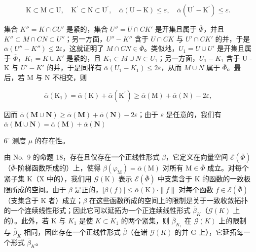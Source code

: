 \[
\mathrm{K} \subset \mathrm{M} \subset \mathrm{U}, \quad \mathrm{K} ^ {\prime} \subset \mathrm{N} \subset \mathrm{U} ^ {\prime}, \quad \overline {{\alpha}} (\mathrm{U} - \mathrm{K}) \leqslant \varepsilon , \quad \overline {{\alpha}} (\mathrm{U} ^ {\prime} - \mathrm{K} ^ {\prime}) \leqslant \varepsilon .
\]

集合 \(K'' = K \cap C U'\) 是紧的，集合 \(U'' = U \cap C K'\) 是开集且属于 \(\overline{\Phi}\)，并且 \(K'' \subset M \cap C N \subset U''\)；另一方面，\(U'' - K''\) 含于 \(U \cap C K\) 与 \(U' \cap C K'\) 的并，于是 \(\overline{\alpha}(U'' - K'') \leqslant 2\varepsilon\)，这就证明了 \(M \cap C N \in \overline{\Phi}\)。类似地，\(U_1 = U \cup U'\) 是开集且属于 \(\overline{\Phi}\)，\(K_1 = K \cup K'\) 是紧的，且 \(K_1 \subset M \cup N \subset U_1\)；另一方面，\(U_1 - K_1\) 含于 U - K 与 \(U' - K'\) 的并，于是同样有 \(\overline{\alpha}(U_1 - K_1) \leqslant 2\varepsilon\)，从而 \(M \cup N\) 属于 \(\overline{\Phi}\)。最后，若 M 与 N 不相交，则

\[
\overline {{{{\alpha}}}} \left(\mathrm{K} _ {1}\right) = \overline {{{{\alpha}}}} (\mathrm{K}) + \overline {{{{\alpha}}}} \left(\mathrm{K} ^ {\prime}\right) \geqslant \overline {{{{\alpha}}}} (\mathrm{M}) + \overline {{{{\alpha}}}} (\mathrm{N}) - 2 \varepsilon ,
\]

因而 \(\overline{\alpha} (\mathbf{M}\cup \mathbf{N})\geqslant \overline{\alpha} (\mathbf{M}) + \overline{\alpha} (\mathbf{N}) - 2\varepsilon\)；由于 \(\varepsilon\) 是任意的，我们有 \(\overline{\alpha} (\mathbf{M}\cup \mathbf{N}) = \overline{\alpha} (\mathbf{M}) + \overline{\alpha} (\mathbf{N})\)

\(6^{\circ}\) 测度 \(\mu\) 的存在性。

由 No.~9 的命题 18，存在且仅存在一个正线性形式 \(\beta\)，它定义在向量空间 \(\mathcal{E}(\overline{\Phi})\)（\(\overline{\Phi}\)-阶梯函数所成的）上，使得 \(\beta(\varphi_{\mathrm{M}}) = \overline{\alpha}(\mathrm{M})\) 对所有 \(\mathrm{M} \in \overline{\Phi}\) 成立。对每个紧子集 \(\mathrm{K}\)（\(\mathrm{X}\) 中的），我们用 \(\mathcal{G}(\mathrm{K})\) 表示 \(\mathcal{E}(\overline{\Phi})\) 中支集含于 \(\mathrm{K}\) 的函数的一致极限所成的空间。由于 \(\beta\) 是正的，\(|\beta(f)| \leqslant \overline{\alpha}(\mathrm{K}) \cdot \|f\|\) 对每个函数 \(f \in \mathcal{E}(\overline{\Phi})\)（支集含于 \(\mathrm{K}\) 者）成立；\(\beta\) 在这些函数所成的空间上的限制是关于一致收敛拓扑的一个连续线性形式；因此它可以延拓为一个正连续线性形式 \(\overline{\beta}_{K}\)（\(\mathcal{G}(K)\) 上的）。此外，若 K 与 \(K_{1}\) 是使 \(K \subset K_{1}\) 的两个紧集，则 \(\overline{\beta}_{K_{1}}\) 在 \(\mathcal{G}(K)\) 上的限制与 \(\overline{\beta}_{K}\) 相同，因此存在一个正线性形式 \(\overline{\beta}\)（在诸 \(\mathcal{G}(K)\) 的并 G 上），它延拓每一个形式 \(\overline{\beta}_{K}\)。

